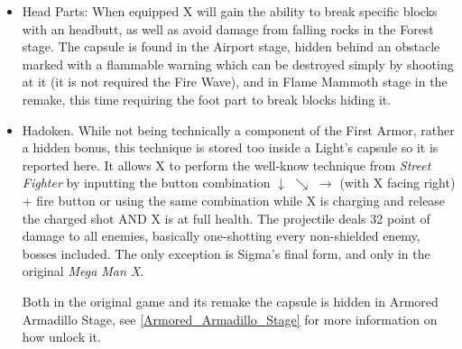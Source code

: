 \begin{itemize}
	\item Head Parts: When equipped X will gain the ability to break specific blocks with an headbutt, as well as avoid damage from falling rocks in the Forest stage. The capsule is found in the Airport stage, hidden behind an obstacle marked with a flammable warning which can be destroyed simply by shooting at it (it is not required the Fire Wave), and in Flame Mammoth stage in the remake, this time requiring the foot part to break blocks hiding it.
	
	\item Hadoken. While not being technically a component of the First Armor, rather a hidden bonus, this technique is stored too inside a Light's capsule so it is reported here. It allows X to perform the well-know technique from \textit{Street Fighter} by inputting the button combination $\downarrow$ $\searrow$ $\rightarrow$ (with X facing right) + fire button or using the same combination while X is charging and release the charged shot\cite{RTA_wiki:X1}  AND X is at full health. The projectile deals 32 point of damage\cite{wiki:Hadoken} to all enemies, basically one-shotting every non-shielded enemy, bosses included. The only exception is Sigma's final form, and only in the original \textit{Mega Man X}. 
	
	Both in the original game and its remake the capsule is hidden in Armored Armadillo Stage, see \ref{Armored_Armadillo_Stage} for more information on how unlock it.
\end{itemize}
